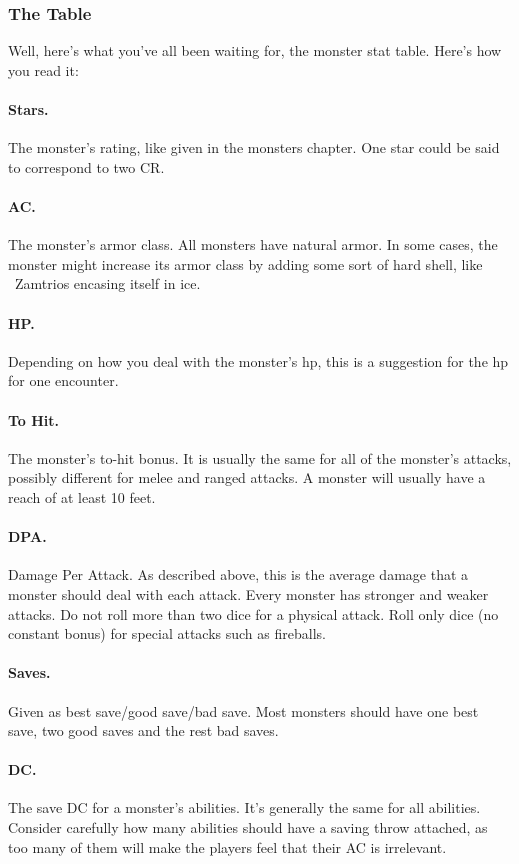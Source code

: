 \subsubsection{The Table}
Well, here's what you've all been waiting for, the monster stat table. Here's how you read it:

\paragraph{Stars.} The monster's rating, like given in the monsters chapter. One star could be said to correspond to two CR.
\paragraph{AC.} The monster's armor class. All monsters have natural armor. In some cases, the monster might increase its armor class by adding some sort of hard shell, like ~Zamtrios encasing itself in ice.
\paragraph{HP.} Depending on how you deal with the monster's hp, this is a suggestion for the hp for one encounter.
\paragraph{To Hit.} The monster's to-hit bonus. It is usually the same for all of the monster's attacks, possibly different for melee and ranged attacks. A monster will usually have a reach of at least 10 feet.
\paragraph{DPA.} Damage Per Attack. As described above, this is the average damage that a monster should deal with each attack. Every monster has stronger and weaker attacks. Do not roll more than two dice for a physical attack. Roll only dice (no constant bonus) for special attacks such as fireballs.
\paragraph{Saves.} Given as best save/good save/bad save. Most monsters should have one best save, two good saves and the rest bad saves.
\paragraph{DC.} The save DC for a monster's abilities. It's generally the same for all abilities. Consider carefully how many abilities should have a saving throw attached, as too many of them will make the players feel that their AC is irrelevant.

